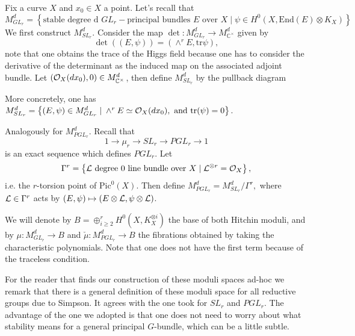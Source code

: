 Fix a curve $X$ and $x_0 \in X$ a point. Let's recall that
\[M^d_{GL_r} = \left\{\mbox{stable degree d }GL_r-\mbox{principal
    bundles } E
  \mbox{ over }X \; | \; \psi \in H^0(X,\mbox{End}(E)\otimes
  K_X)\right\}\]
We first construct $M^d_{SL_r}$. Consider the map $\det: M^d_{GL_r}
\rightarrow M^d_{\mathbb{C}^{\times}}$ given by
\[\det((E,\psi)) = (\wedge^{r}E, \mbox{tr}\psi),\]
note that one obtains the trace of the Higgs field because one has to
consider the derivative of the determinant as the induced map on the
associated adjoint bundle. Let $(\mathcal{O}_X(dx_0),0) \in
M^d_{\mathbb{C}^{\times}}$, then define $M^d_{SL_r}$ by the pullback diagram
\begin{figure}[h!]
\centering
{}
\end{figure}

More concretely, one has $M^d_{SL_r}=\left\{(E,\psi) \in M^d_{GL_r} \;
  | \; \wedge^rE \simeq \mathcal{O}_X(dx_0), \mbox{ and tr}(\psi) =
  0\right\}$.

Analogously for $M^d_{PGL_r}$. Recall that
\[1 \rightarrow \mu_r \rightarrow SL_r \rightarrow PGL_r \rightarrow 1\]
is an exact sequence which defines $PGL_r$. Let 
\[ \Gamma^r = \left\{\mathcal{L}
\mbox{ degree 0 line bundle over }X \; | \; \mathcal{L}^{\otimes r} =
\mathcal{O}_X\right\},\] 
i.e. the $r$-torsion point of $\mbox{Pic}^0(X)$. Then
define $M^d_{PGL_r} = M^{d}_{SL_r}/\Gamma^r,$ where $\mathcal{L} \in \Gamma^r$
acts by $(E,\psi) \mapsto (E\otimes \mathcal{L},\psi \otimes \mathcal{L})$.

We will denote by $B = \oplus^r_{i \geq 2}H^0(X,K^{\otimes i}_X)$ the
base of both Hitchin moduli, and by $\mu: M^d_{GL_r} \rightarrow B$ and
$\check{\mu}:M^d_{PGL_r} \rightarrow B$ the fibrations obtained by taking the
characteristic polynomials. Note that one does not have the first term
because of the traceless condition.

\begin{rem*}
For the reader that finds our construction of these moduli spaces
ad-hoc we remark that there is a general definition of these moduli
space for all reductive groups due to Simpson. It agrees with the one
took for $SL_r$ and $PGL_r$. The advantage of the one we adopted is
that one does not need to worry about what stability means for a
general principal $G$-bundle, which can be a little subtle.
\end{rem*}

